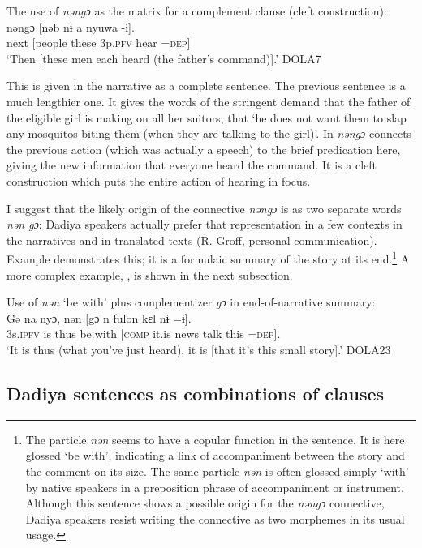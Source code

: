 \documentclass[output=paper]{langscibook}
\begin{document}
\ea The use of \textit{nəngɔ} as the matrix for a complement clause (cleft construction):
\label{ex:dettweiler:DOLA7} \\
\gll nəngɔ [nəb nɨ a nyuwa -i]. \\
next [people these 3p.\textsc{pfv} hear =\textsc{dep}] \\
\glt `Then [these men each heard (the father's command)].' DOLA7
\z

\noindent This is given in the narrative as a complete sentence. The previous sentence is a much lengthier one. It gives the words of the stringent demand that the father of the eligible girl is making on all her suitors, that `he does not want them to slap any mosquitos biting them (when they are talking to the girl)'. In  \textit{nəngɔ} connects the previous action (which was actually a speech) to the brief predication here, giving the new information that everyone heard the command. It is a cleft construction which puts the entire action of hearing in focus.

I suggest that the likely origin of the connective \textit{nəngɔ} is as two separate words \textit{nən gɔ}: Dadiya speakers actually prefer that representation in a few contexts in the narratives and in translated texts (R. Groff, personal communication). Example  demonstrates this; it is a formulaic summary of the story at its end.\footnote{The particle \textit{nən} seems to have a copular function in the sentence. It is here glossed `be with', indicating a link of accompaniment between the story and the comment on its size. The same particle \textit{nən} is often glossed simply `with' by native speakers in a preposition phrase of accompaniment or instrument. Although this sentence shows a possible origin for the \textit{nəngɔ} connective, Dadiya speakers resist writing the connective as two morphemes in its usual usage.} A more complex example, , is shown in the next subsection.

\ea Use of \textit{nən} `be with' plus complementizer \textit{gɔ} in end-of-narrative summary:
\label{ex:dettweiler:DOLA23} \\
\gll Gə na nyɔ, nən [gɔ n fulon kɛl nɨ =ɨ]. \\
3s.\textsc{ipfv} is thus be.with [\textsc{comp} it.is news talk this =\textsc{dep}]. \\
\glt `It is thus (what you've just heard), it is [that it's this small story].' DOLA23
\z

\subsection{Dadiya sentences as combinations of clauses}
\end{document}
